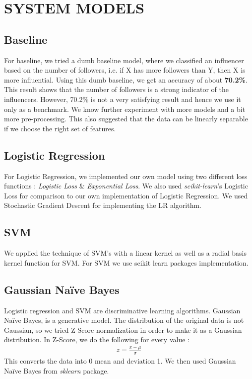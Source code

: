 \documentclass[conference]{IEEEtran}
\numberwithin{equation}{section}
\numberwithin{figure}{section}
\numberwithin{table}{section}
\begin{document}
\section{SYSTEM MODELS
}\label{sec:fig-tables}


\subsection{Baseline}\label{sec:cap-num}
For baseline, we tried a dumb baseline model, where we classified an influencer based on the number of followers, i.e. if X has more followers than Y, then X is more influential. Using this dumb baseline, we get an accuracy of about \textbf{70.2\%}. This result shows
that the number of followers is a strong indicator
of the influencers. However, 70.2\% is not a very satisfying result and hence we use it only as a benchmark. We know further experiment with more models and a bit more pre-processing. This also suggested that the data can be linearly separable if we choose the right set of features.

\subsection{Logistic Regression}\label{sec:colour-illustrations}
For Logistic Regression, we implemented our own model using two different loss functions : \textit{Logistic Loss} \& \textit{Exponential Loss}. We also used \textit{scikit-learn}'s Logistic Loss for comparison to our own implementation of Logistic Regression. We used Stochastic Gradient Descent for implementing the LR algorithm.

\subsection{SVM}\label{sec:colour-illustrations}
We applied the technique of SVM's with a linear kernel as well as a radial basis kernel function for SVM. For SVM we use scikit learn packages implementation. \cite{svm}

\subsection{Gaussian Na{\"i}ve Bayes}\label{sec:colour-illustrations}
Logistic regression and SVM are discriminative learning algorithms. Gaussian Na{\"i}ve Bayes, is a generative model. The distribution of the original data is not Gaussian, so we tried Z-Score normalization in order to make it as a Gaussian distribution. In Z-Score, we do the following for every value : 
\begin{align*}
z = \frac{x - \mu}{\sigma}
\end{align*}
This converts the data into 0 mean and deviation 1. We then used Gaussian Na{\"i}ve Bayes from \textit{sklearn} package. \cite{gnb}
\end{document}
